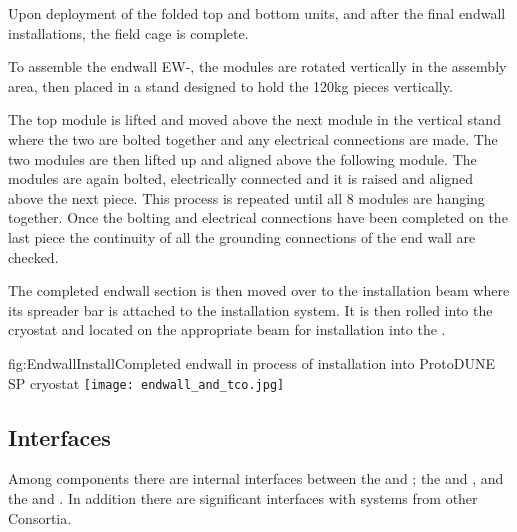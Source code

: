 Upon deployment of the folded top and bottom  units, and after the final endwall installations, the  field cage is complete.

To assemble the endwall EW-, the modules are rotated vertically in the assembly area, then placed in a stand designed to hold the 120kg pieces vertically.

The top module is lifted and moved above the next module in the vertical stand where the two are bolted together and any electrical connections are made. The two modules are then lifted up and aligned above the following module.  The modules are again bolted, electrically connected and it is raised and aligned above the next piece.  This process is repeated until all 8 modules are hanging together.  Once the bolting and electrical connections have been completed on the last piece the continuity of all the grounding connections of the end wall are checked.
 
The completed endwall section is then moved over to the installation beam where its spreader bar is attached to the installation system.  It is then rolled into the cryostat and located on the appropriate beam for installation into the .

\begin{dunefigure}{fig:EndwallInstall}{Completed endwall in process of installation into ProtoDUNE SP cryostat}
\texttt{[image: endwall\_and\_tco.jpg]}
\end{dunefigure}



\subsection{Interfaces}
\label{sec:fdsp-hv-interface}

Among  components there are internal interfaces between the  and ; the  and , and  the  and . In addition there are significant interfaces with systems from other Consortia.

